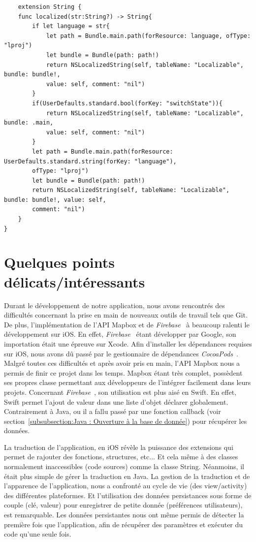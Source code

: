 \documentclass{article}
\begin{document}
\begin{verbatim}
    extension String {
    func localized(str:String?) -> String{
        if let language = str{
            let path = Bundle.main.path(forResource: language, ofType: "lproj")
            let bundle = Bundle(path: path!)
            return NSLocalizedString(self, tableName: "Localizable", bundle: bundle!,
            value: self, comment: "nil")
        }
        if(UserDefaults.standard.bool(forKey: "switchState")){
            return NSLocalizedString(self, tableName: "Localizable", bundle: .main,
            value: self, comment: "nil")
        }
        let path = Bundle.main.path(forResource: UserDefaults.standard.string(forKey: "language"), 
        ofType: "lproj")
        let bundle = Bundle(path: path!)
        return NSLocalizedString(self, tableName: "Localizable", bundle: bundle!, value: self,
        comment: "nil")
    }
}  
\end{verbatim}


\newpage %


\section{Quelques points délicats/intéressants}

Durant le développement de notre application, nous avons rencontrés des difficultés concernant la prise en main
de nouveaux outils de travail tels que Git.
De plus, l'implémentation de l'API Mapbox et de \textit{Firebase}~\cite{firebaseDoc} à beaucoup ralenti
le développement sur iOS. En effet, \textit{Firebase}~\cite{firebaseDoc} étant développer par Google, son importation
était une épreuve sur Xcode. Afin d'installer les dépendances requises sur iOS, nous avons dû passé par
le gestionnaire de dépendances \textit{CocoaPods}~\cite{cocoapodsDoc}.
Malgré toutes ces difficultés et après avoir pris en main, l'API Mapbox nous a permis de finir ce projet dans les temps.
Mapbox étant très complet, possèdent ses propres classe permettant aux développeurs de l'intégrer facilement dans leurs projets.
Concernant \textit{Firebase}~\cite{firebaseDoc}, son utilisation est plus aisé en Swift. En effet, Swift permet
l'ajout de valeur dans une liste d'objet déclarer globalement. Contrairement à Java, ou il a fallu passé par une
fonction callback (voir section~\ref{subsubsection:Java : Ouverture à la base de donnée}) pour récupérer les données.

La traduction de l'application, en iOS révèle la puissance des extensions qui permet de rajouter des fonctions, structures, etc...
Et cela même à des classes normalement inaccessibles (code sources) comme la classe String. Néanmoins, il était plus simple de gérer la traduction en Java.
La gestion de la traduction et de l'apparence de l'application, nous a confronté au cycle de vie (des view/activity) des différentes plateformes.
Et l'utilisation des données persistances sous forme de couple (clé, valeur) pour enregistrer de petite donnée (préférences utilisateurs), est remarquable.
Les données persistantes nous ont même permis de détecter la première fois que l'application, afin de récupérer des paramètres et exécuter du code qu'une seule fois.
\end{document}
